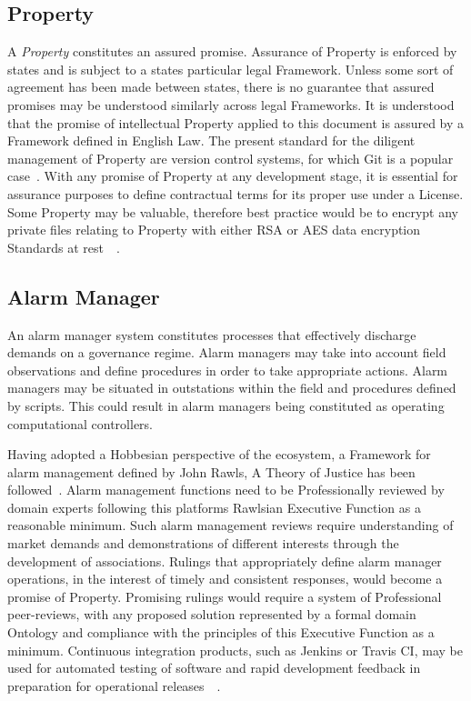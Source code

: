 \documentclass[11pt, oneside]{article}   	%
\begin{document}
\subsection{Property}
A \emph{Property} constitutes an assured promise.
Assurance of Property is enforced by states and is subject to a states particular legal Framework.
Unless some sort of agreement has been made between states, there is no guarantee that assured promises may be understood similarly across legal Frameworks.
It is understood that the promise of intellectual Property applied to this document is assured by a Framework defined in English Law.
The present standard for the diligent management of Property are version control systems, for which Git is a popular case~\cite{git}.
With any promise of Property at any development stage, it is essential for assurance purposes to define contractual terms for its proper use under a License.
Some Property may be valuable, therefore best practice would be to encrypt any private files relating to Property with either RSA or AES data encryption Standards at rest~\cite{rsa}~\cite{aes}.

\subsection{Alarm Manager}
An alarm manager system constitutes processes that effectively discharge demands on a governance regime.
Alarm managers may take into account field observations and define procedures in order to take appropriate actions.
Alarm managers may be situated in outstations within the field and procedures defined by scripts.
This could result in alarm managers being constituted as operating computational controllers.\

Having adopted a Hobbesian perspective of the ecosystem, a Framework for alarm management defined by John Rawls, A Theory of Justice has been followed~\cite{jr1}.
Alarm management functions need to be Professionally reviewed by domain experts following this platforms Rawlsian Executive Function as a reasonable minimum.
Such alarm management reviews require understanding of market demands and demonstrations of different interests through the development of associations.
Rulings that appropriately define alarm manager operations, in the interest of timely and consistent responses, would become a promise of Property.
Promising rulings would require a system of Professional peer-reviews, with any proposed solution represented by a formal domain Ontology and compliance with the principles of this Executive Function as a minimum.
Continuous integration products, such as Jenkins or Travis CI, may be used for automated testing of software and rapid development feedback in preparation for operational releases~\cite{jenkins}~\cite{travis}.\
\end{document}
